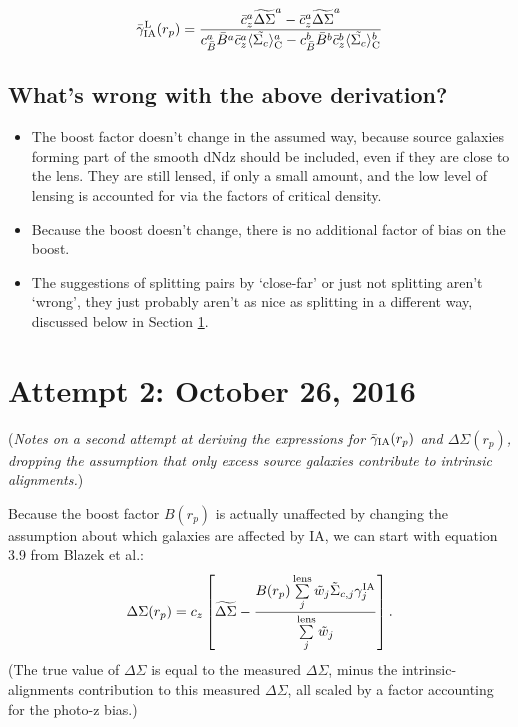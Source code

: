 \documentclass[onecolumn,amsmath,aps,fleqn, superscriptaddress]{revtex4}
\begin{document}
{\begin{equation}
\bar{\gamma}^{\rm L}_{\rm IA}(r_p) = \frac{\bar{c}_z^a \widetilde{\Delta\Sigma}^a - \bar{c}_z^a \widetilde{\Delta\Sigma}^a}{c_{\bar B}^a \bar{B}^a\bar{c}_z^a \langle \tilde{\Sigma_c}\rangle_{\rm C}^a - c_{\bar B}^b \bar{B}^b\bar{c}_z^b \langle \tilde{\Sigma_c}\rangle_{\rm C}^b}
\label{gamma_sol_splitLOS}
\end{equation}

\subsection*{What's wrong with the above derivation?}

\begin{itemize}
\item{The boost factor doesn't change in the assumed way, because source galaxies forming part of the smooth dNdz should be included, even if they are close to the lens. They are still lensed, if only a small amount, and the low level of lensing is accounted for via the factors of critical density.}
\item{Because the boost doesn't change, there is no additional factor of bias on the boost.}
\item{The suggestions of splitting pairs by `close-far' or just not splitting aren't `wrong', they just probably aren't as nice as splitting in a different way, discussed below in Section \ref{sec:oct26}}.
\end{itemize}

\section{Attempt 2: October 26, 2016}
\label{sec:oct26}

({\it Notes on a second attempt at deriving the expressions for $\bar{\gamma}_{\rm IA}(r_p)$ and $\Delta \Sigma(r_p)$, dropping the assumption that only excess source galaxies contribute to intrinsic alignments.})

Because the boost factor $B(r_p)$ is actually unaffected by changing the assumption about which galaxies are affected by IA, we can start with equation 3.9 from Blazek et al.:
\begin{equation}
\Delta\Sigma(r_p) = c_z \left[\widetilde{\Delta \Sigma} - \frac{B(r_p) \sum\limits_{j}^{\rm lens} \tilde{w}_j \tilde{\Sigma}_{c,j}\gamma^{\rm IA}_j }{\sum\limits_{j}^{\rm lens} \tilde{w}_j}\right].
\label{Blazek3pt9}
\end{equation}
(The true value of $\Delta \Sigma$ is equal to the measured $\Delta \Sigma$, minus the intrinsic-alignments contribution to this measured $\Delta \Sigma$, all scaled by a factor accounting for the photo-z bias.)

}
\end{document}
